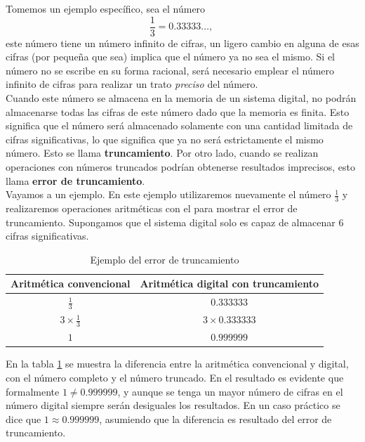 Tomemos un ejemplo específico, sea el número
\[ \dfrac{1}{3} = 0.33333\dots, \ \]
este número tiene un número infinito de cifras, un ligero cambio en alguna de esas cifras (por pequeña que sea) implica que el número ya no sea el mismo. 
Si el número no se escribe en su forma racional, será necesario emplear el número infinito de cifras para realizar un trato \textit{preciso} del número. \\

Cuando este número se almacena en la memoria de un sistema digital, no podrán almacenarse todas las cifras de este número dado que la memoria es finita. 
Esto significa que el número será almacenado solamente con una cantidad limitada de cifras significativas, lo que significa que ya no será estrictamente 
el mismo número. Esto se llama \textbf{truncamiento}.
Por otro lado, cuando se realizan operaciones con números truncados podrían obtenerse resultados imprecisos, esto llama \textbf{error de truncamiento}.\\

Vayamos a un ejemplo. En este ejemplo utilizaremos nuevamente el número $\frac{1}{3}$ y realizaremos operaciones aritméticas con el para mostrar el 
error de truncamiento. Supongamos que el sistema digital solo es capaz de almacenar 6 cifras significativas.

\begin{table}[H]
	\centering
	\begin{tabular}{cc}
		\toprule
		\textbf{Aritmética convencional} & \textbf{Aritmética digital con truncamiento}\\
		\midrule
		$\frac{1}{3}$ & $0.333333$\\
		$3\times\frac{1}{3}$ & $3\times 0.333333$\\
		$1$ & $0.999999$	\\	
		\bottomrule
	\end{tabular}
	\caption{Ejemplo del error de truncamiento}
	\label{table:errorTruncamiento}
\end{table}

En la tabla \ref{table:errorTruncamiento} se muestra la diferencia entre la aritmética convencional y digital, con el número completo y el número truncado. 
En el resultado es evidente que  formalmente $1\not= 0.999999$, y aunque se tenga un mayor número de cifras en el número digital siempre serán desiguales 
los resultados. En un caso práctico se dice que $1\approx 0.999999$, asumiendo que la diferencia es resultado del error de truncamiento.\\

